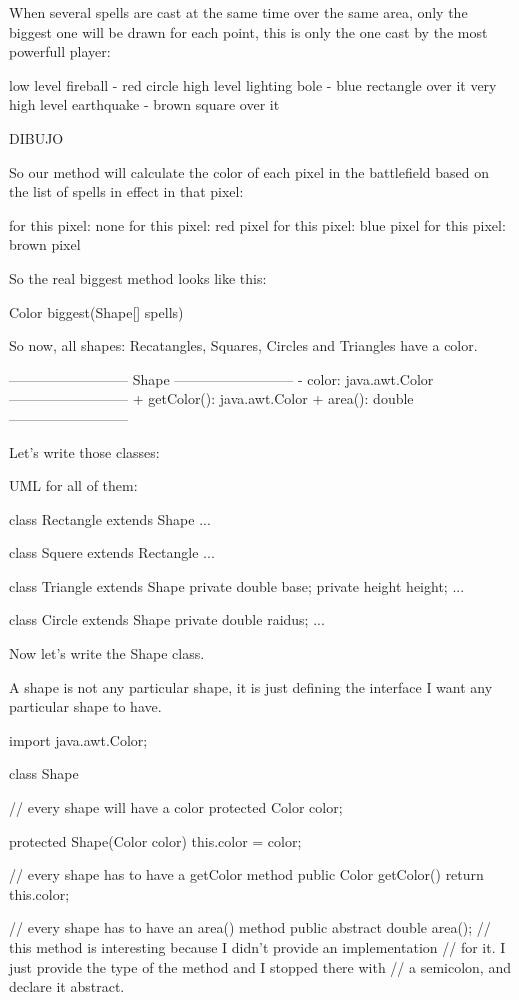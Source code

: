 \documentclass[a4paper, 9pt]{extarticle}
\begin{document}
\begin{blackboard}
When several spells are cast at the same time over the same area, only the
biggest one will be drawn for each point, this is only the one cast by the
most powerfull player:

low level fireball - red circle
high level lighting bole - blue rectangle over it
very high level earthquake - brown square over it

DIBUJO

So our method will calculate the color of each pixel in the battlefield based
on the list of spells in effect in that pixel:

for this pixel: none
for this pixel: red pixel
for this pixel: blue pixel
for this pixel: brown pixel

So the real biggest method looks like this:

Color biggest(Shape[] spells)

So now, all shapes: Recatangles, Squares, Circles and Triangles have a color.

--------------------------
Shape
--------------------------
- color: java.awt.Color
--------------------------
+ getColor(): java.awt.Color
+ area(): double
--------------------------

Let's write those classes:

UML for all of them:

class Rectangle extends Shape {
...
}

class Squere extends Rectangle {
...
}

class Triangle extends Shape {
  private double base;
  private height height;
...
}

class Circle extends Shape {
  private double raidus;
...
}

Now let's write the Shape class.

A shape is not any particular shape, it is just defining the interface I want
any particular shape to have.

import java.awt.Color;

class Shape {
    // every shape will have a color
    protected Color color;

    protected Shape(Color color) {
        this.color = color;
    }

    // every shape has to have a getColor method
    public Color getColor() {
        return this.color;
    }

    // every shape has to have an area() method
    public abstract double area();
    // this method is interesting because I didn't provide an implementation
    // for it. I just provide the type of the method and I stopped there with 
    // a semicolon, and declare it abstract.
}


\end{blackboard}
\end{document}
